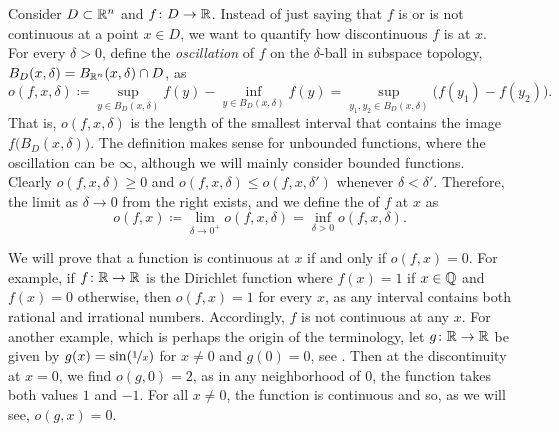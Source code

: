 Consider
$D \subset {\mathbb{R}}^n$ and $f \colon D \to {\mathbb{R}}$.
Instead of just saying that $f$ is or is not continuous at
a point $x \in D$,
we want to quantify how discontinuous $f$ is at $x$.
For every $\delta > 0$, define the \emph{oscillation} of 
$f$ on the $\delta$-ball in subspace topology,
$B_D(x,\delta) = B_{{\mathbb{R}}^n}(x,\delta) \cap D$, as
\begin{equation*}
o(f,x,\delta) \coloneqq
{\sup_{y \in B_D(x,\delta)} f(y)}
-
{\inf_{y \in B_D(x,\delta)} f(y)}
= 
\sup_{y_1,y_2 \in B_D(x,\delta)} \bigl(f(y_1)-f(y_2)\bigr) .
\end{equation*}
That is, $o(f,x,\delta)$ is the length of the smallest interval
that contains the image $f\bigl(B_D(x,\delta)\bigr)$.
The definition makes sense for unbounded functions, where the oscillation
can be $\infty$, although we will mainly consider bounded functions.
Clearly $o(f,x,\delta) \geq 0$ and
$o(f,x,\delta) \leq o(f,x,\delta')$ whenever $\delta < \delta'$.
Therefore, the limit as $\delta \to 0$ from the right exists, and
we define the \emph{} of $f$
at $x$ as
\begin{equation*}
o(f,x) \coloneqq
\lim_{\delta \to 0^+}
o(f,x,\delta) =
\inf_{\delta > 0}
o(f,x,\delta) .
\end{equation*}

We will prove that a function is continuous at $x$ if and only if $o(f,x) = 0$.
For example, if $f \colon {\mathbb{R}} \to {\mathbb{R}}$ is the Dirichlet function where
$f(x)=1$ if $x \in {\mathbb{Q}}$ and $f(x)=0$ otherwise, then $o(f,x) = 1$ for every
$x$, as any interval contains both rational and irrational numbers.
Accordingly, $f$ is not continuous at any $x$.
For another example, which is perhaps the origin of the terminology,
let $g \colon {\mathbb{R}} \to {\mathbb{R}}$ be given by
$g(x) = \sin(\nicefrac{1}{x})$ for $x\neq 0$ and $g(0)=0$,
see .
Then at the discontinuity at $x=0$, we find $o(g,0) = 2$, as
in any neighborhood of $0$, the function takes both values $1$ and $-1$.
For all $x \neq 0$, the function is continuous and so, as we will see,
$o(g,x) = 0$.

\begin{myfigureht}
\caption{Graph of $\sin(\nicefrac{1}{x})$.\label{fig:sin1xosc}}
\end{myfigureht}

